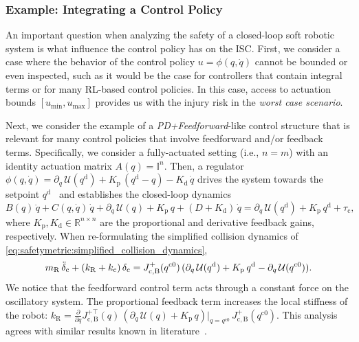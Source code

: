 \subsubsection{Example: Integrating a Control Policy}
An important question when analyzing the safety of a closed-loop soft robotic system is what influence the control policy has on the \gls{ISC}.
First, we consider a case where the behavior of the control policy $u = \phi(q,\dot{q})$ cannot be bounded or even inspected, such as it would be the case for controllers that contain integral terms or for many RL-based control policies.
In this case, access to actuation bounds $[u_\mathrm{min}, u_\mathrm{max}]$ provides us with the injury risk in the \emph{worst case scenario}.

Next, we consider the example of a \emph{PD+Feedforward}-like control structure that is relevant for many control policies that involve feedforward and/or feedback terms.
Specifically, we consider a fully-actuated setting (i.e., $n=m$) with an identity actuation matrix $A(q) = \mathbb{I}^n$.
Then, a regulator $\phi(q,\dot{q}) = \partial_{q} \, \mathcal{U}( q^\mathrm{d}) + K_\mathrm{p} \, (q^\mathrm{d}-q) - K_\mathrm{d} \, \dot{q}$ drives the system towards the setpoint $q^\mathrm{d}$~\citep{della2023model} and establishes the closed-loop dynamics
\begin{equation}
    B(q) \, \ddot{q} + C(q, \dot{q}) \, \dot{q} + \partial_{q} \, \mathcal{U}(q) + K_\mathrm{p} \, q + (D+K_\mathrm{d}) \, \dot{q} = \partial_{q} \, \mathcal{U}( q^\mathrm{d}) + K_\mathrm{p} \, q^\mathrm{d} + \tau_\mathrm{c},
\end{equation}
where $K_\mathrm{p}, K_\mathrm{d} \in \mathbb{R}^{n \times n}$ are the proportional and derivative feedback gains, respectively.
When re-formulating the simplified collision dynamics of \eqref{eq:safetymetric:simplified_collision_dynamics}, 
\begin{equation}
    m_\mathrm{R} \, \Ddot{\delta}_\mathrm{c} + (k_\mathrm{R} + k_\mathrm{c}) \, \delta_\mathrm{c} = J_\mathrm{c,B}^{+}(q^{\mathrm{c}0}) \, (\partial_{q} \, \mathcal{U}(q^\mathrm{d}) +  K_\mathrm{p} \, q^\mathrm{d} - \partial_{q} \, \mathcal{U}(q^{\mathrm{c}0})).
\end{equation}
We notice that the feedforward control term acts through a constant force on the oscillatory system.
The proportional feedback term increases the local stiffness of the robot: $k_\mathrm{R} = \frac{\partial}{\partial q} J_\mathrm{c,B}^{+\top}(q) \, \left ( \partial_{q} \, \mathcal{U}(q) + K_\mathrm{p} \, q \right )\Big |_{q=q^{\mathrm{c}0}} \,  J_\mathrm{c,B}^{+}(q^{\mathrm{c}0})$.
This analysis agrees with similar results known in literature~\citep{della2017controlling}.

